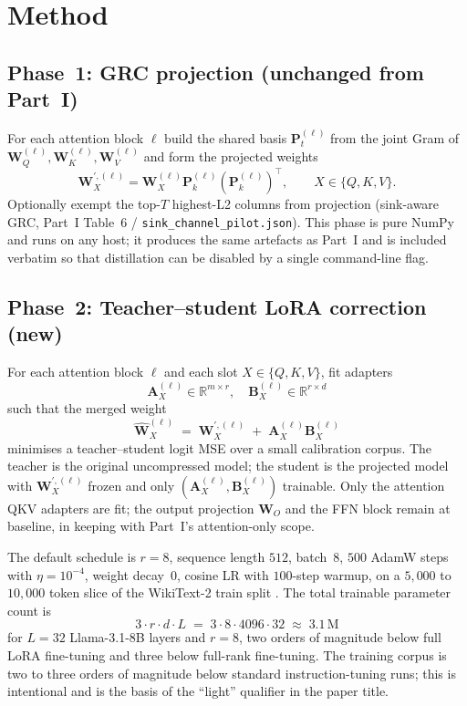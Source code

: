 \documentclass[11pt]{article}
\providecommand{\Amat}{\mathbf{A}}
\providecommand{\Bmat}{\mathbf{B}}
\providecommand{\Pmat}{\mathbf{P}}
\providecommand{\Wmat}{\mathbf{W}}
\begin{document}
\section{Method}
\label{sec:method}

\subsection{Phase~1: GRC projection (unchanged from Part~I)}
\label{sec:phase1}
For each attention block $\ell$ build the shared basis $\Pmat_t^{(\ell)}$
from the joint Gram of $\Wmat_Q^{(\ell)}, \Wmat_K^{(\ell)}, \Wmat_V^{(\ell)}$
and form the projected weights
\[
\Wmat_X^{\prime,(\ell)} = \Wmat_X^{(\ell)} \Pmat_k^{(\ell)} (\Pmat_k^{(\ell)})^\top,
\qquad X \in \{Q,K,V\}.
\]
Optionally exempt the top-$T$ highest-L2 columns from projection
(sink-aware GRC, Part~I Table~6 / \texttt{sink\_channel\_pilot.json}).
This phase is pure NumPy and runs on any host; it produces the same
artefacts as Part~I and is included verbatim so that distillation can
be disabled by a single command-line flag.

\subsection{Phase~2: Teacher--student LoRA correction (new)}
\label{sec:phase2}
For each attention block $\ell$ and each slot $X \in \{Q,K,V\}$, fit
adapters
\[
\Amat_X^{(\ell)} \in \mathbb{R}^{m \times r},\quad
\Bmat_X^{(\ell)} \in \mathbb{R}^{r \times d}
\]
such that the merged weight
\[
\hat{\Wmat}_X^{(\ell)} \;=\; \Wmat_X^{\prime,(\ell)} \;+\; \Amat_X^{(\ell)} \Bmat_X^{(\ell)}
\]
minimises a teacher--student logit MSE over a small calibration corpus.
The teacher is the original uncompressed model; the student is the
projected model with $\Wmat_X^{\prime,(\ell)}$ frozen and only
$(\Amat_X^{(\ell)}, \Bmat_X^{(\ell)})$ trainable. Only the attention QKV
adapters are fit; the output projection $\Wmat_O$ and the FFN block
remain at baseline, in keeping with Part~I's attention-only scope.

The default schedule is $r{=}8$, sequence length $512$, batch~$8$,
$500$ AdamW steps with $\eta{=}10^{-4}$, weight decay~$0$, cosine LR
with $100$-step warmup, on a $5{,}000$ to $10{,}000$ token slice of
the WikiText-2 train split \cite{merity2016wikitext}. The total
trainable parameter count is
\[
3 \cdot r \cdot d \cdot L \;=\; 3 \cdot 8 \cdot 4096 \cdot 32 \;\approx\; 3.1\,\mathrm{M}
\]
for $L{=}32$ Llama-3.1-8B layers and $r{=}8$, two orders of magnitude
below full LoRA fine-tuning and three below full-rank fine-tuning. The
training corpus is two to three orders of magnitude below standard
instruction-tuning runs; this is intentional and is the basis of the
``light'' qualifier in the paper title.
\end{document}
